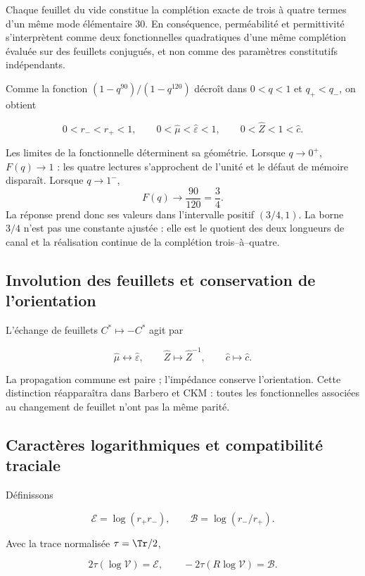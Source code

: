 Chaque feuillet du vide constitue la complétion exacte de trois à quatre
termes d'un même mode élémentaire \(30\). En conséquence, perméabilité
et permittivité s'interprètent comme deux fonctionnelles quadratiques d'une même
complétion évaluée sur des feuillets conjugués, et non comme des paramètres
constitutifs indépendants.

Comme la fonction \((1-q^{90})/(1-q^{120})\) décroît dans \(0<q<1\) et \(q_+<q_-\), on obtient

\[
0<r_-<r_+<1,\qquad
0<\widehat\mu<\widehat\varepsilon<1,\qquad
0<\widehat Z<1<\widehat c.
\]

Les limites de la fonctionnelle déterminent sa géométrie. Lorsque \(q\to0^+\),
\(F(q)\to1\) : les quatre lectures s'approchent de l'unité et le défaut de
mémoire disparaît. Lorsque \(q\to1^-\),
\[
F(q)\longrightarrow\frac{90}{120}=\frac34.
\]
La réponse prend donc ses valeurs dans l'intervalle positif \((3/4,1)\). La
borne \(3/4\) n'est pas une constante ajustée : elle est le quotient des deux
longueurs de canal et la réalisation continue de la complétion
trois--à--quatre.

\subsection{Involution des feuillets et conservation de l'orientation}

L'échange de feuillets \(C^*\mapsto-C^*\) agit par

\begin{equation}
\widehat\mu\longleftrightarrow\widehat\varepsilon,\qquad
\widehat Z\longmapsto\widehat Z^{-1},
\qquad
\widehat c\longmapsto\widehat c.
\label{rm:eq:vacuum-sheet}
\end{equation}

La propagation commune est paire ; l'impédance conserve l'orientation.
Cette distinction réapparaîtra dans Barbero et CKM : toutes les fonctionnelles
associées au changement de feuillet n'ont pas la même parité.

\subsection{Caractères logarithmiques et compatibilité traciale}

Définissons

\[
\mathcal E=\log(r_+r_-),\qquad
\mathcal B=\log(r_-/r_+).
\]

Avec la trace normalisée \(\tau=\Tr/2\),

\begin{equation}
2\tau(\log\mathcal V)=\mathcal E,
\qquad
-2\tau(R\log\mathcal V)=\mathcal B.
\label{rm:eq:vacuum-traces}
\end{equation}

